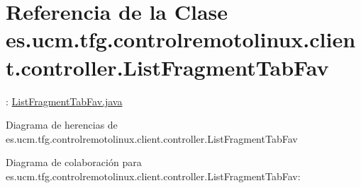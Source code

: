 \hypertarget{classes_1_1ucm_1_1tfg_1_1controlremotolinux_1_1client_1_1controller_1_1ListFragmentTabFav}{\section{Referencia de la Clase es.\-ucm.\-tfg.\-controlremotolinux.\-client.\-controller.\-List\-Fragment\-Tab\-Fav}
\label{classes_1_1ucm_1_1tfg_1_1controlremotolinux_1_1client_1_1controller_1_1ListFragmentTabFav}
}


\-: \hyperlink{ListFragmentTabFav_8java}{List\-Fragment\-Tab\-Fav.\-java}  




Diagrama de herencias de es.\-ucm.\-tfg.\-controlremotolinux.\-client.\-controller.\-List\-Fragment\-Tab\-Fav


Diagrama de colaboración para es.\-ucm.\-tfg.\-controlremotolinux.\-client.\-controller.\-List\-Fragment\-Tab\-Fav\-:
